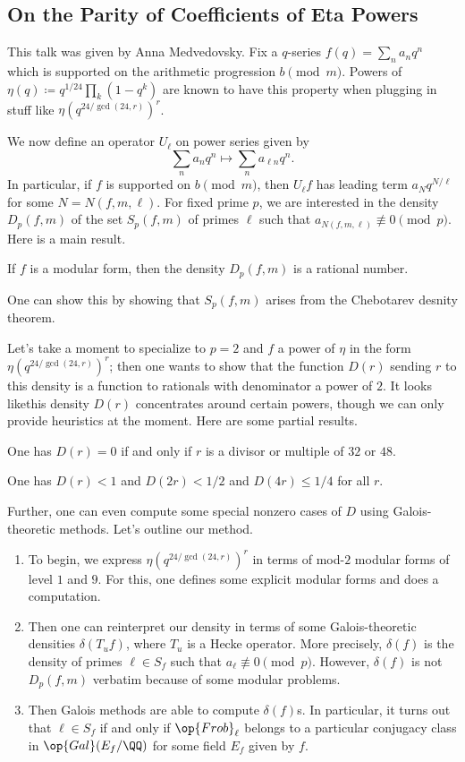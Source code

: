 \documentclass{article}
\begin{document}
\subsection{On the Parity of Coefficients of Eta Powers}
This talk was given by Anna Medvedovsky. Fix a $q$-series $f(q)=\sum_{n}a_nq^n$ which is supported on the arithmetic progression $b\pmod m$. Powers of $\eta(q)\coloneqq q^{1/24}\prod_{k}\left(1-q^k\right)$ are known to have this property when plugging in stuff like $\eta\left(q^{24/\gcd(24,r)}\right)^{r}$.

We now define an operator $U_\ell$ on power series given by
\[\sum_na_nq^n\mapsto\sum_na_{\ell n}q^n.\]
In particular, if $f$ is supported on $b\pmod m$, then $U_\ell f$ has leading term $a_Nq^{N/\ell}$ for some $N=N(f,m,\ell)$. For fixed prime $p$, we are interested in the density $D_p(f,m)$ of the set $S_p(f,m)$ of primes $\ell$ such that $a_{N(f,m,\ell)}\not\equiv0\pmod p$. Here is a main result.
\begin{theorem}
	If $f$ is a modular form, then the density $D_p(f,m)$ is a rational number.
\end{theorem}
One can show this by showing that $S_p(f,m)$ arises from the Chebotarev desnity theorem.

Let's take a moment to specialize to $p=2$ and $f$ a power of $\eta$ in the form $\eta\left(q^{24/\gcd(24,r)}\right)^{r}$; then one wants to show that the function $D(r)$ sending $r$ to this density is a function to rationals with denominator a power of $2$. It looks likethis density $D(r)$ concentrates around certain powers, though we can only provide heuristics at the moment. Here are some partial results.
\begin{theorem}
	One has $D(r)=0$ if and only if $r$ is a divisor or multiple of $32$ or $48$.
\end{theorem}
\begin{theorem}
	One has $D(r)<1$ and $D(2r)<1/2$ and $D(4r)\le1/4$ for all $r$.
\end{theorem}
Further, one can even compute some special nonzero cases of $D$ using Galois-theoretic methods. Let's outline our method.
\begin{enumerate}
	\item To begin, we express $\eta\left(q^{24/\gcd(24,r)}\right)^{r}$ in terms of mod-$2$ modular forms of level $1$ and $9$. For this, one defines some explicit modular forms and does a computation.
	\item Then one can reinterpret our density in terms of some Galois-theoretic densities $\delta(T_uf)$, where $T_u$ is a Hecke operator. More precisely, $\delta(f)$ is the density of primes $\ell\in S_f$ such that $a_\ell\not\equiv0\pmod p$. However, $\delta(f)$ is not $D_p(f,m)$ verbatim because of some modular problems.
	\item Then Galois methods are able to compute $\delta(f)$s. In particular, it turns out that $\ell\in S_f$ if and only if $\op{Frob}_\ell$ belongs to a particular conjugacy class in $\op{Gal}(E_f/\QQ)$ for some field $E_f$ given by $f$.
\end{enumerate}
\end{document}

